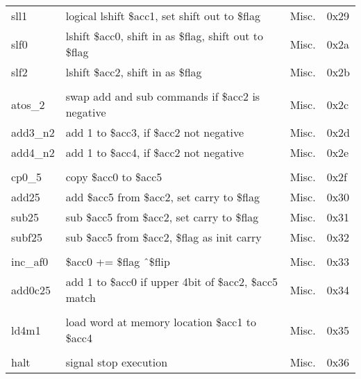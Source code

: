 \documentclass{article}
\begin{document}
\begin{longtable}[c]{L{2.6cm}|L{9.5cm}|C{1.2cm}|C{1.2cm}}
      sll1               & logical lshift \$acc1, set shift out to \$flag     & Misc.     & 0x29 \\
      slf0               & lshift \$acc0, shift in as \$flag, shift out to \$flag & Misc. & 0x2a \\
      slf2               & lshift \$acc2, shift in as \$flag                  & Misc.     & 0x2b \\
                         &                                                    &           &      \\
      atos\_2            & swap add and sub commands if \$acc2 is negative    & Misc.     & 0x2c \\
      add3\_n2           & add 1 to \$acc3, if \$acc2 not negative            & Misc.     & 0x2d \\
      add4\_n2           & add 1 to \$acc4, if \$acc2 not negative            & Misc.     & 0x2e \\
                         &                                                    &           &      \\
      cp0\_5             & copy \$acc0 to \$acc5                              & Misc.     & 0x2f \\
      add25              & add \$acc5 from \$acc2, set carry to \$flag        & Misc.     & 0x30 \\
      sub25              & sub \$acc5 from \$acc2, set carry to \$flag        & Misc.     & 0x31 \\
      subf25             & sub \$acc5 from \$acc2, \$flag as init carry       & Misc.     & 0x32 \\
                         &                                                    &           &      \\
      inc\_af0           & \$acc0 += \$flag \^\ \$flip                        & Misc.     & 0x33 \\
      add0c25            & add 1 to \$acc0 if upper 4bit of \$acc2, \$acc5 match & Misc.  & 0x34 \\
                         &                                                    &           &      \\
      ld4m1              & load word at memory location \$acc1 to \$acc4      & Misc.     & 0x35 \\
                         &                                                    &           &      \\
      halt               & signal stop execution                              & Misc.     & 0x36
    \end{longtable}
    \rmfamily
  \newpage
\end{document}
